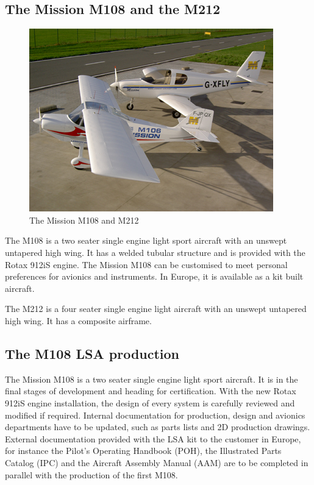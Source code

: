 \documentclass[11pt,a4paper]{article}
\begin{document}
\newpage

\subsection{The Mission M108 and the M212}
\begin{figure}[ht!]
	\begin{center}
		\includegraphics[trim = 0cm 1cm 0cm 1cm,clip]{pics/PIC003.jpg}
		\caption{The Mission M108 and M212}
		\label{fig:PIC003}
	\end{center}
\end{figure}


The M108 is a two seater single engine light sport aircraft with an unswept untapered high wing. It has a welded tubular structure and is provided with the Rotax 912iS engine. The Mission M108 can be customised to meet personal preferences for avionics and instruments. In Europe, it is available as a kit built aircraft.

\bigskip

The M212 is a four seater single engine light aircraft with an unswept untapered high wing. It has a composite airframe.

\subsection{The M108 LSA production}
The Mission M108 is a two seater single engine light sport aircraft. It is in the final stages of development and heading for certification. With the new Rotax 912iS engine installation, the design of every system is carefully reviewed and modified if required. Internal documentation for production, design and avionics departments have to be updated, such as parts lists and 2D production drawings. External documentation provided with the LSA kit to the customer in Europe, for instance the Pilot's Operating Handbook (POH), the Illustrated Parts Catalog (IPC) and the Aircraft Assembly Manual (AAM) are to be completed in parallel with the production of the first M108.
\end{document}
